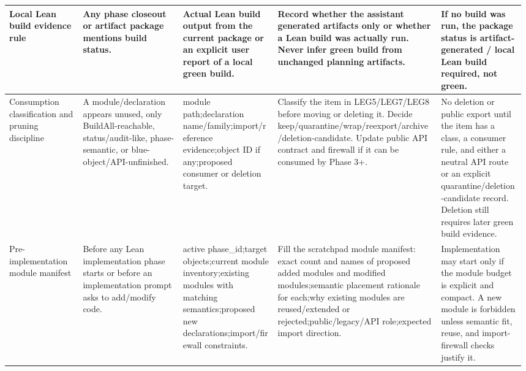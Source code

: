 \begin{longtable}{L{0.14\linewidth} L{0.19\linewidth} L{0.18\linewidth} L{0.31\linewidth} L{0.16\linewidth}}
\hline
\addlinespace[0.24em]
Local Lean build evidence rule & Any phase closeout or artifact package mentions build status. & Actual Lean build output from the current package or an explicit user report of a local green build. & Record whether the assistant generated artifacts only or whether a Lean build was actually run. Never infer green build from unchanged planning artifacts. & If no build was run, the package status is artifact-generated /\allowbreak{} local Lean build required, not green.\\
\hline
\addlinespace[0.24em]
Consumption classification and pruning discipline & A module/\allowbreak{}declaration appears unused, only BuildAll-reachable, status/\allowbreak{}audit-like, phase-semantic, or blue-object/\allowbreak{}API-unfinished. & module path;\newline declaration name/\allowbreak{}family;\newline import/\allowbreak{}reference evidence;\newline object ID if any;\newline proposed consumer or deletion target. & Classify the item in LEG5/\allowbreak{}LEG7/\allowbreak{}LEG8 before moving or deleting it. Decide keep/\allowbreak{}quarantine/\allowbreak{}wrap/\allowbreak{}reexport/\allowbreak{}archive/\allowbreak{}deletion-candidate. Update public API contract and firewall if it can be consumed by Phase 3+. & No deletion or public export until the item has a class, a consumer rule, and either a neutral API route or an explicit quarantine/\allowbreak{}deletion-candidate record. Deletion still requires later green build evidence.\\
\hline
\addlinespace[0.24em]
Pre-implementation module manifest & Before any Lean implementation phase starts or before an implementation prompt asks to add/\allowbreak{}modify code. & active phase\_id;\newline target objects;\newline current module inventory;\newline existing modules with matching semantics;\newline proposed new declarations;\newline import/\allowbreak{}firewall constraints. & Fill the scratchpad module manifest: exact count and names of proposed added modules and modified modules;\newline semantic placement rationale for each;\newline why existing modules are reused/\allowbreak{}extended or rejected;\newline public/\allowbreak{}legacy/\allowbreak{}API role;\newline expected import direction. & Implementation may start only if the module budget is explicit and compact. A new module is forbidden unless semantic fit, reuse, and import-firewall checks justify it.\\

\end{longtable}
